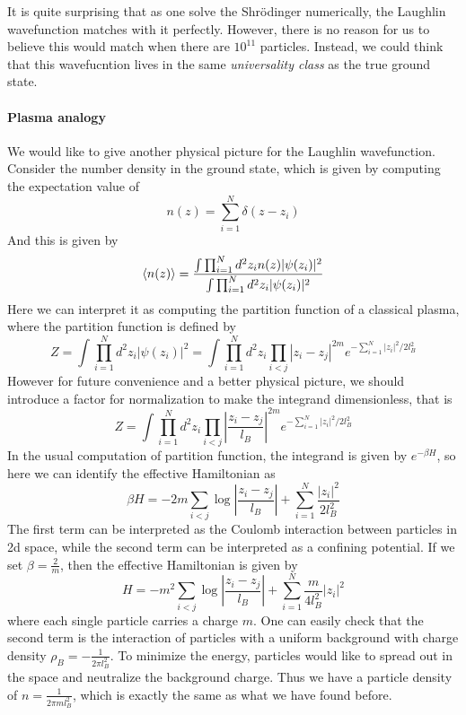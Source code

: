 \documentclass[12pt,a4paper]{article}
\numberwithin{equation}{section}
\begin{document}
It is quite surprising that as one solve the Shrödinger numerically, the Laughlin wavefunction matches with it perfectly. However, there is no reason for us to believe this would match when there are $10^{11}$ particles.
Instead, we could think that this wavefucntion lives in the same \textit{universality class} as the true ground state. 

\paragraph{Plasma analogy}
We would like to give another physical picture for the Laughlin wavefunction. Consider the number density in the ground state, which is given by computing the expectation value of
\begin{equation}
    n(z) = \sum_{i=1}^N \delta(z-z_i)
\end{equation}
And this is given by
\begin{equation}
    \expval{n(z)} = \frac{\int \prod_{i=1}^N d^2z_i n(z) |\psi(z_i)|^2}{\int \prod_{i=1}^N d^2z_i |\psi(z_i)|^2}
\end{equation}
Here we can interpret it as computing the partition function of a classical plasma, where the partition function is defined by
\begin{equation}
    Z = \int \prod_{i=1}^N d^2z_i |\psi(z_i)|^2 = \int \prod_{i=1}^N d^2z_i \prod_{i<j} |z_i-z_j|^{2m} e^{-\sum_{i=1}^N |z_i|^2/2l_B^2} 
\end{equation}
However for future convenience and a better physical picture, we should introduce a factor for normalization to make the integrand dimensionless, that is
\begin{equation}
    Z = \int \prod_{i=1}^N d^2z_i \prod_{i<j} \left|\frac{z_i-z_j}{l_B}\right|^{2m} e^{-\sum_{i=1}^N |z_i|^2/2l_B^2}
\end{equation}
In the usual computation of partition function, the integrand is given by $e^{-\beta H}$, so here we can identify the effective Hamiltonian as
\begin{equation}
    \beta H = -2m \sum_{i<j} \log\left|\frac{z_i-z_j}{l_B}\right| + \sum_{i=1}^N \frac{|z_i|^2}{2l_B^2}
\end{equation}
The first term can be interpreted as the Coulomb interaction between particles in 2d space, while the second term can be interpreted as a confining potential.
If we set $\beta = \frac{2}{m}$, then the effective Hamiltonian is given by
\begin{equation}
    H = -m^2 \sum_{i<j} \log\left|\frac{z_i-z_j}{l_B}\right| + \sum_{i=1}^N \frac{m}{4l_B^2}|z_i|^2
\end{equation}
where each single particle carries a charge $m$. One can easily check that the second term is the interaction of particles with a uniform background with charge density $\rho_B = -\frac{1}{2\pi l_B^2}$.
To minimize the energy, particles would like to spread out in the space and neutralize the background charge. Thus we have a particle density of $n = \frac{1}{2\pi m l_B^2}$, which is exactly the same as what we have found before.
\end{document}
